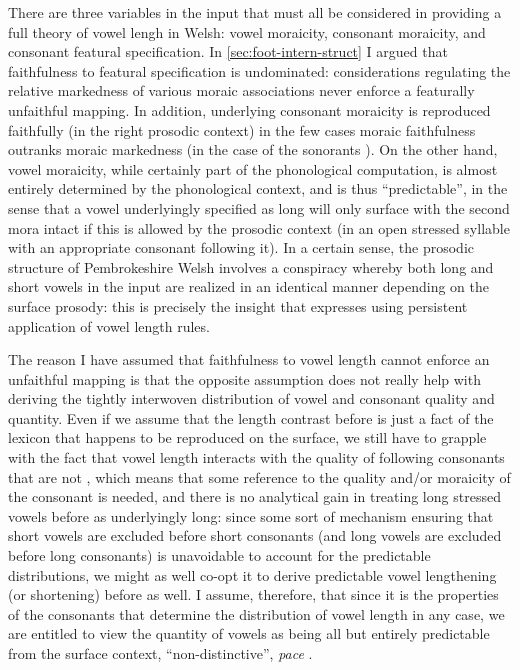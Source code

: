 There are three variables in the input that must all be considered in providing a full theory of vowel lengh in Welsh: vowel moraicity, consonant moraicity, and consonant featural specification. In \cref{sec:foot-intern-struct} I argued that faithfulness to featural specification is undominated: considerations regulating the relative markedness of various moraic associations never enforce a featurally unfaithful mapping. In addition, underlying consonant moraicity is reproduced faithfully (in the right prosodic context) in the few cases moraic faithfulness outranks moraic markedness (\ie in the case of the sonorants \ipa{[n~l~r]}). On the other hand, vowel moraicity, while certainly part of the phonological computation, is almost entirely determined by the phonological context, and is thus \enquote{predictable}, in the sense that a vowel underlyingly specified as long will only surface with the second mora intact if this is allowed by the prosodic context (\ie in an open stressed syllable with an appropriate consonant following it). In a certain sense, the prosodic structure of Pembrokeshire Welsh involves a conspiracy \citep{kisseberth70,kenstkiss} whereby both long and short vowels in the input are realized in an identical manner depending on the surface prosody: this is precisely the insight that \citet{awbery86:_pembr_welsh} expresses using persistent application of vowel length rules.

The reason I have assumed that faithfulness to vowel length cannot enforce an unfaithful mapping is that the opposite assumption does not really help with deriving the tightly interwoven distribution of vowel and consonant quality and quantity. Even if we assume that the length contrast before \ipa{[n~l~r]} is just a fact of the lexicon that happens to be reproduced on the surface, we still have to grapple with the fact that vowel length interacts with the quality of following consonants that are not \ipa{[n~l~r]}, which means that some reference to the quality and/or moraicity of the consonant is needed, and there is no analytical gain in treating long stressed vowels before \ipa{[n~l~r]} as underlyingly long: since some sort of mechanism ensuring that short vowels are excluded before short consonants (and long vowels are excluded before long consonants) is unavoidable to account for the predictable distributions, we might as well co\hyp opt it to derive predictable vowel lengthening (or shortening) before \ipa{[n~l~r]} as well. I assume, therefore, that since it is the properties of the consonants that determine the distribution of vowel length in any case, we are entitled to view the quantity of vowels as being all but entirely predictable from the surface context, \ie \enquote{non\hyp distinctive}, \emph{pace} \citet{awbery86:_pembr_welsh}.

